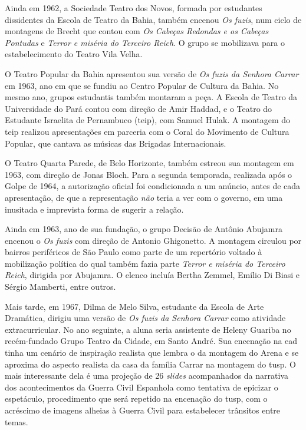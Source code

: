 Ainda em 1962, a Sociedade Teatro dos Novos, formada por estudantes
dissidentes da Escola de Teatro da Bahia, também encenou {\it Os fuzis},
num ciclo de montagens de Brecht que contou com {\it Os Cabeças Redondas
e os Cabeças Pontudas} e {\it Terror e miséria do Terceiro Reich}. O
grupo se mobilizava para o estabelecimento do Teatro Vila Velha.

O Teatro Popular da Bahia apresentou sua versão de {\it Os fuzis da
Senhora Carrar} em 1963, ano em que se fundiu ao Centro Popular de
Cultura da Bahia. No mesmo ano, grupos estudantis também montaram a
peça. A Escola de Teatro da Universidade do Pará contou com direção de
Amir Haddad, e o Teatro do Estudante Israelita de Pernambuco ({\sc teip}), com
Samuel Hulak. A montagem do {\sc teip} realizou apresentações em parceria com
o Coral do Movimento de Cultura Popular, que cantava as músicas das
Brigadas Internacionais.

O Teatro Quarta Parede, de Belo Horizonte, também estreou sua montagem
em 1963, com direção de Jonas Bloch. Para a segunda temporada, realizada
após o Golpe de 1964, a autorização oficial foi condicionada a um
anúncio, antes de cada apresentação, de que a representação {\it não}
teria a ver com o governo, em uma inusitada e imprevista forma de
sugerir a relação.

Ainda em 1963, ano de sua fundação, o grupo Decisão de Antônio Abujamra
encenou o {\it Os fuzis} com direção de Antonio Ghigonetto. A montagem
circulou por bairros periféricos de São Paulo como parte de um
repertório voltado à mobilização política do qual também fazia parte
{\it Terror e miséria do Terceiro Reich}, dirigida por Abujamra. O
elenco incluía Bertha Zemmel, Emílio Di Biasi e Sérgio Mamberti, entre
outros.

Mais tarde, em 1967, Dilma de Melo Silva, estudante da Escola de Arte
Dramática, dirigiu uma versão de {\it Os fuzis da Senhora Carrar} como
atividade extracurricular. No ano seguinte, a aluna seria assistente de
Heleny Guariba no recém-fundado Grupo Teatro da Cidade, em Santo André.
Sua encenação na {\sc ead} tinha um cenário de inspiração realista que lembra
o da montagem do Arena e se aproxima do aspecto realista da casa da
família Carrar na montagem do {\sc tusp}. O mais interessante dela é uma
projeção de 26 {\it slides} acompanhados da narrativa dos acontecimentos
da Guerra Civil Espanhola como tentativa de epicizar o espetáculo,
procedimento que será repetido na encenação do {\sc tusp}, com o acréscimo de
imagens alheias à Guerra Civil para estabelecer trânsitos entre temas.

